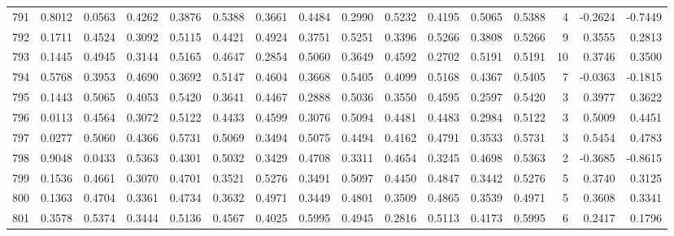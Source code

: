 \begin{tabular}{lrrrrrrrrrrrrrrr}
791 &      0.8012 &  0.0563 &  0.4262 &  0.3876 &  0.5388 &  0.3661 &  0.4484 &  0.2990 &  0.5232 &  0.4195 &   0.5065 &     0.5388 &      4 &                   -0.2624 &                    -0.7449 \\
792 &      0.1711 &  0.4524 &  0.3092 &  0.5115 &  0.4421 &  0.4924 &  0.3751 &  0.5251 &  0.3396 &  0.5266 &   0.3808 &     0.5266 &      9 &                    0.3555 &                     0.2813 \\
793 &      0.1445 &  0.4945 &  0.3144 &  0.5165 &  0.4647 &  0.2854 &  0.5060 &  0.3649 &  0.4592 &  0.2702 &   0.5191 &     0.5191 &     10 &                    0.3746 &                     0.3500 \\
794 &      0.5768 &  0.3953 &  0.4690 &  0.3692 &  0.5147 &  0.4604 &  0.3668 &  0.5405 &  0.4099 &  0.5168 &   0.4367 &     0.5405 &      7 &                   -0.0363 &                    -0.1815 \\
795 &      0.1443 &  0.5065 &  0.4053 &  0.5420 &  0.3641 &  0.4467 &  0.2888 &  0.5036 &  0.3550 &  0.4595 &   0.2597 &     0.5420 &      3 &                    0.3977 &                     0.3622 \\
796 &      0.0113 &  0.4564 &  0.3072 &  0.5122 &  0.4433 &  0.4599 &  0.3076 &  0.5094 &  0.4481 &  0.4483 &   0.2984 &     0.5122 &      3 &                    0.5009 &                     0.4451 \\
797 &      0.0277 &  0.5060 &  0.4366 &  0.5731 &  0.5069 &  0.3494 &  0.5075 &  0.4494 &  0.4162 &  0.4791 &   0.3533 &     0.5731 &      3 &                    0.5454 &                     0.4783 \\
798 &      0.9048 &  0.0433 &  0.5363 &  0.4301 &  0.5032 &  0.3429 &  0.4708 &  0.3311 &  0.4654 &  0.3245 &   0.4698 &     0.5363 &      2 &                   -0.3685 &                    -0.8615 \\
799 &      0.1536 &  0.4661 &  0.3070 &  0.4701 &  0.3521 &  0.5276 &  0.3491 &  0.5097 &  0.4450 &  0.4847 &   0.3442 &     0.5276 &      5 &                    0.3740 &                     0.3125 \\
800 &      0.1363 &  0.4704 &  0.3361 &  0.4734 &  0.3632 &  0.4971 &  0.3449 &  0.4801 &  0.3509 &  0.4865 &   0.3539 &     0.4971 &      5 &                    0.3608 &                     0.3341 \\
801 &      0.3578 &  0.5374 &  0.3444 &  0.5136 &  0.4567 &  0.4025 &  0.5995 &  0.4945 &  0.2816 &  0.5113 &   0.4173 &     0.5995 &      6 &                    0.2417 &                     0.1796 \\

\end{tabular}
